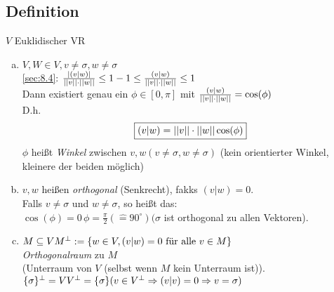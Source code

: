 \subsection{}\label{sec:\thesubsection}
\subsection{}\label{sec:\thesubsection}
\subsection{}\label{sec:\thesubsection}
\subsection{Definition}
$V$ Euklidischer VR
\begin{enumerate}[a)]
\item $V,W \in V, v \ne \sigma,w \ne \sigma$\\
\ref{sec:8.4}: $\frac{\lvert (v|w) \rvert}{\lvert \lvert v \rvert \rvert \cdot \lvert \lvert w \rvert \rvert} \leq 1\\
-1 \leq \frac{(v|w)}{\lvert \lvert v \rvert \rvert \cdot \lvert \lvert w \rvert \rvert} \leq 1$\\
Dann existiert genau ein $\phi \in [0,\pi]$ mit $\frac{(v|w)}{\lvert \lvert v \rvert \rvert \cdot \lvert \lvert w \rvert \rvert} = \cos(\phi) $\\
D.h.
\begin{equation*}
\boxed{(v|w) = {\lvert \lvert v \rvert \rvert \cdot \lvert \lvert w \rvert \rvert \cos(\phi)}}
\end{equation*}
$\phi$ hei\ss t \emph{Winkel} zwischen $v,w (v \ne \sigma, w \ne \sigma)$ (kein orientierter Winkel, kleinere der beiden möglich)
\item $v,w$ hei\ss en \emph{orthogonal} (Senkrecht), fakks $(v|w) = 0$.\\
Falls $v \ne \sigma$ und $w \ne \sigma$, so hei\ss t das:\\
$\cos(\phi) = 0\,\phi = \frac{\pi}{2} (\widehat{=} 90^{\circ}) (\sigma $ ist orthogonal zu allen Vektoren).
\item $M \subseteq V\\
M^{\perp} := \{w \in V, (v|w) = 0 \text{ für alle }v \in M  \}$\\
\emph{Orthogonalraum} zu $M$\\
(Unterraum von $V$ (selbst wenn $M$ kein Unterraum ist)).\\
$\{ \sigma \}^{\perp} = V\\
V^{\perp} = \{ \sigma \}
(v \in V^{\perp} \Rightarrow (v|v) = 0 \Rightarrow v = \sigma)$
\end{enumerate}
